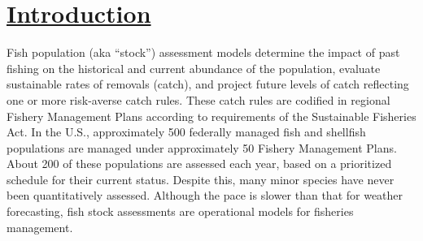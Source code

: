 \section{\hyperref[sec:intro]{Introduction}}\label{sec:intro}

Fish population (aka ``stock'') assessment models determine the impact of past fishing on the historical and current abundance of the population, evaluate sustainable rates of removals (catch), and project future levels of catch reflecting one or more risk-averse catch rules. These catch rules are codified in regional Fishery Management Plans according to requirements of the Sustainable Fisheries Act. In the U.S., approximately 500 federally managed fish and shellfish populations are managed under approximately 50 Fishery Management Plans. About 200 of these populations are assessed each year, based on a prioritized schedule for their current status. Despite this, many minor species have never been quantitatively assessed. Although the pace is slower than that for weather forecasting, fish stock assessments are operational models for fisheries management.



